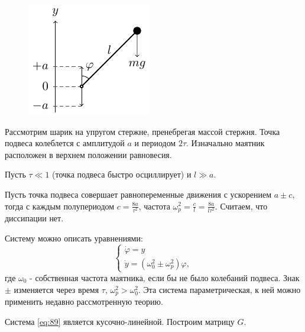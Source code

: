 
\begin{figure} 
\vspace{0.15em}
\centering
\includegraphics[scale=1.5]{img/kap_pendulum/kap_pendulum}
\end{figure}
Рассмотрим шарик на упругом стержне, пренебрегая массой стержня. Точка подвеса колеблется с амплитудой $a$ и периодом $2\tau$. Изначально маятник расположен в верхнем положении равновесия. 


Пусть $\tau \ll 1$ (точка подвеса быстро осциллирует) и $l\gg a$.

Пусть точка подвеса совершает равнопеременные движения с ускорением $a \pm c$, тогда с каждым полупериодом $c=\frac{8a}{\tau^2}$, частота $\omega_p^2=\frac{c}{l}=\frac{8a}{l\tau^2}$. Считаем, что диссипации нет. 

Систему можно описать уравнениями:
\begin{equation}
	\left\{\begin{aligned}
		\dot{\varphi}=y \\
		\dot{y}=(\omega_0^2 \pm \omega_p^2)	\varphi,
	\end{aligned}\right.
	\label{eq:89}	
\end{equation}
где $\omega_0$ - собственная частота маятника, если бы не было колебаний подвеса. Знак $\pm$ изменяется через время $\tau$, $\omega_p^2>\omega_0^2$. Эта система параметрическая, к ней можно применить недавно рассмотренную теорию. 

Система  \eqref{eq:89} является кусочно-линейной. Построим матрицу $G$.

